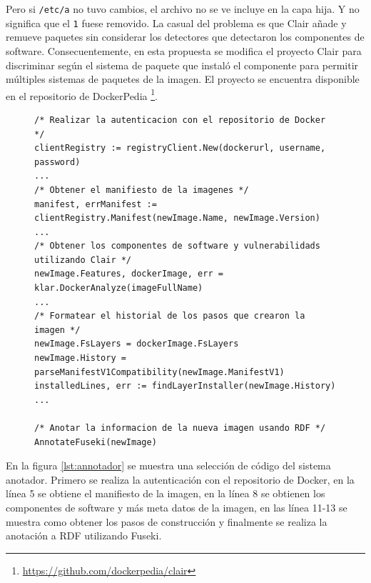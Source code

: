 Pero si \verb|/etc/a| no tuvo cambios, el archivo no se ve incluye en la capa hija. Y no significa que el \verb|1| fuese removido. 
La casual del problema es que Clair añade y remueve paquetes sin considerar los detectores que detectaron los componentes de software. 
Consecuentemente, en esta propuesta se modifica el proyecto Clair para discriminar según el sistema de paquete que instaló el componente para permitir múltiples sistemas de paquetes de la imagen. El proyecto se encuentra disponible en el repositorio de DockerPedia \footnote{\url{https://github.com/dockerpedia/clair}}.
\begin{figure}[h]
	\begin{lstlisting}[caption={Proceso de obtención de las descripciones},label={lst:annotador},language=GoLang]
/* Realizar la autenticacion con el repositorio de Docker */
clientRegistry := registryClient.New(dockerurl, username, password)
...
/* Obtener el manifiesto de la imagenes */
manifest, errManifest := clientRegistry.Manifest(newImage.Name, newImage.Version)
...
/* Obtener los componentes de software y vulnerabilidads utilizando Clair */
newImage.Features, dockerImage, err = klar.DockerAnalyze(imageFullName)
...
/* Formatear el historial de los pasos que crearon la imagen */
newImage.FsLayers = dockerImage.FsLayers
newImage.History = parseManifestV1Compatibility(newImage.ManifestV1)
installedLines, err := findLayerInstaller(newImage.History)
...

/* Anotar la informacion de la nueva imagen usando RDF */
AnnotateFuseki(newImage)
\end{lstlisting}
\end{figure}


En la figura \ref{lst:annotador} se muestra una selección de código del sistema anotador. Primero se realiza la autenticación con el repositorio de Docker, en la línea 5 se obtiene el manifiesto de la imagen, en la línea 8 se obtienen los componentes de software y más meta datos de la imagen, en las línea 11-13 se muestra como obtener los pasos de construcción y finalmente se realiza la anotación a RDF utilizando Fuseki.


